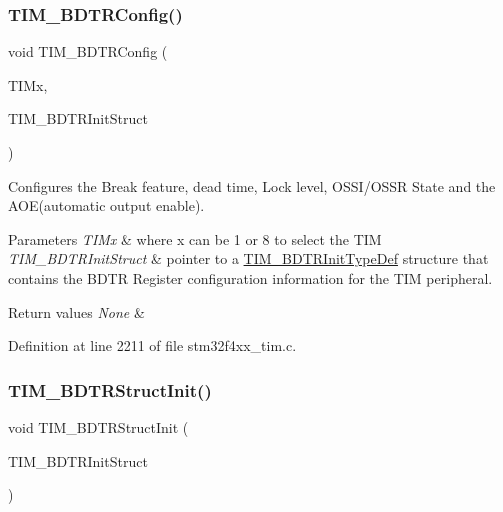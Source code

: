 \subsubsection{\texorpdfstring{T\+I\+M\+\_\+\+B\+D\+T\+R\+Config()}{TIM\_BDTRConfig()}}
{\footnotesize\ttfamily void T\+I\+M\+\_\+\+B\+D\+T\+R\+Config (\begin{DoxyParamCaption}\item[{\hyperlink{struct_t_i_m___type_def}{T\+I\+M\+\_\+\+Type\+Def} $\ast$}]{T\+I\+Mx,  }\item[{\hyperlink{struct_t_i_m___b_d_t_r_init_type_def}{T\+I\+M\+\_\+\+B\+D\+T\+R\+Init\+Type\+Def} $\ast$}]{T\+I\+M\+\_\+\+B\+D\+T\+R\+Init\+Struct }\end{DoxyParamCaption})}



Configures the Break feature, dead time, Lock level, O\+S\+S\+I/\+O\+S\+SR State and the A\+O\+E(automatic output enable). 


\begin{DoxyParams}{Parameters}
{\em T\+I\+Mx} & where x can be 1 or 8 to select the T\+IM \\
\hline
{\em T\+I\+M\+\_\+\+B\+D\+T\+R\+Init\+Struct} & pointer to a \hyperlink{struct_t_i_m___b_d_t_r_init_type_def}{T\+I\+M\+\_\+\+B\+D\+T\+R\+Init\+Type\+Def} structure that contains the B\+D\+TR Register configuration information for the T\+IM peripheral. \\
\hline
\end{DoxyParams}

\begin{DoxyRetVals}{Return values}
{\em None} & \\
\hline
\end{DoxyRetVals}


Definition at line 2211 of file stm32f4xx\+\_\+tim.\+c.

\mbox{\label{group___t_i_m___group4_gaea0f49938cda8ae0738162194798afc6}} 
\subsubsection{\texorpdfstring{T\+I\+M\+\_\+\+B\+D\+T\+R\+Struct\+Init()}{TIM\_BDTRStructInit()}}
{\footnotesize\ttfamily void T\+I\+M\+\_\+\+B\+D\+T\+R\+Struct\+Init (\begin{DoxyParamCaption}\item[{\hyperlink{struct_t_i_m___b_d_t_r_init_type_def}{T\+I\+M\+\_\+\+B\+D\+T\+R\+Init\+Type\+Def} $\ast$}]{T\+I\+M\+\_\+\+B\+D\+T\+R\+Init\+Struct }\end{DoxyParamCaption})}



